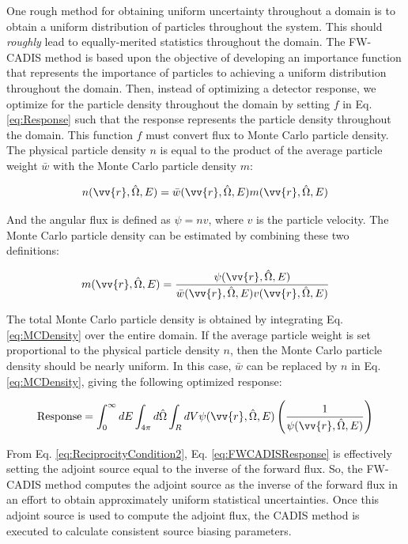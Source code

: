 \documentclass[10pt]{article}
\newcommand{\hO}{\hat{\Omega}}
\begin{document}
\begin{flushleft}
One rough method for obtaining uniform uncertainty throughout a domain is to obtain a uniform distribution of particles throughout the system. This should \textit{roughly} lead to equally-merited statistics throughout the domain. The FW-CADIS method is based upon the objective of developing an importance function that represents the importance of particles to achieving a uniform distribution throughout the domain. Then, instead of optimizing a detector response, we optimize for the particle density throughout the domain by setting \(f\) in Eq. \eqref{eq:Response} such that the response represents the particle density throughout the domain. This function \(f\) must convert flux to Monte Carlo particle density. The physical particle density \(n\) is equal to the product of the average particle weight \(\bar{w}\) with the Monte Carlo particle density \(m\):

\begin{equation}
n(\vv{r},\hO  ,E)=\bar{w}(\vv{r},\hO  ,E)m(\vv{r},\hO  ,E)
\end{equation}

And the angular flux is defined as \(\psi=nv\), where \(v\) is the particle velocity. The Monte Carlo particle density can be estimated by combining these two definitions:

\begin{equation}
\label{eq:MCDensity}
m(\vv{r},\hO  ,E)=\frac{\psi(\vv{r},\hO  ,E)}{\bar{w}(\vv{r},\hO  ,E)v(\vv{r},\hO  ,E)}
\end{equation}

The total Monte Carlo particle density is obtained by integrating Eq. \eqref{eq:MCDensity} over the entire domain. If the average particle weight is set proportional to the physical particle density \(n\), then the Monte Carlo particle density should be nearly uniform. In this case, \(\bar{w}\) can be replaced by \(n\) in Eq. \eqref{eq:MCDensity}, giving the following optimized response:

\begin{equation}
\label{eq:FWCADISResponse}
\textrm{Response}=\int_0^\infty dE\int_{4\pi}d\hO  \int_RdV\psi(\vv{r},\hO  ,E)\left(\frac{1}{\psi(\vv{r},\hO  ,E)}\right)
\end{equation}

From Eq. \eqref{eq:ReciprocityCondition2}, Eq. \eqref{eq:FWCADISResponse} is effectively setting the adjoint source equal to the inverse of the forward flux. So, the FW-CADIS method computes the adjoint source as the inverse of the forward flux in an effort to obtain approximately uniform statistical uncertainties. Once this adjoint source is used to compute the adjoint flux, the CADIS method is executed to calculate consistent source biasing parameters.


\end{flushleft}
\end{document}
